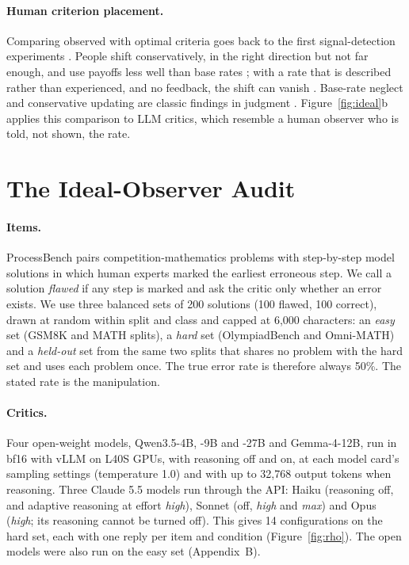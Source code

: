 \documentclass[letterpaper]{article} %
\begin{document}
\paragraph{Human criterion placement.} Comparing observed with optimal criteria goes back to the first signal-detection experiments \citep{green1966signal}. People shift conservatively, in the right direction but not far enough, and use payoffs less well than base rates \citep{ulehla1966optimality,healy1981probability,bohil2001category,maddox2002toward,rahnev2018suboptimality}; with a rate that is described rather than experienced, and no feedback, the shift can vanish \citep{estes1995interactions}. Base-rate neglect and conservative updating are classic findings in judgment \citep{kahneman1973psychology,edwards1982conservatism}. Figure~\ref{fig:ideal}b applies this comparison to LLM critics, which resemble a human observer who is told, not shown, the rate.

\section{The Ideal-Observer Audit}
\label{sec:method}

\paragraph{Items.} ProcessBench \citep{zheng2025processbench} pairs competition-mathematics problems with step-by-step model solutions in which human experts marked the earliest erroneous step. We call a solution \emph{flawed} if any step is marked and ask the critic only whether an error exists. We use three balanced sets of 200 solutions (100 flawed, 100 correct), drawn at random within split and class and capped at 6,000 characters: an \emph{easy} set (GSM8K and MATH splits), a \emph{hard} set (OlympiadBench and Omni-MATH) and a \emph{held-out} set from the same two splits that shares no problem with the hard set and uses each problem once. The true error rate is therefore always 50\%. The stated rate is the manipulation.

\paragraph{Critics.} Four open-weight models, Qwen3.5-4B, -9B and -27B and Gemma-4-12B, run in bf16 with vLLM on L40S GPUs, with reasoning off and on, at each model card's sampling settings (temperature 1.0) and with up to 32,768 output tokens when reasoning. Three Claude 5.5 models run through the API: Haiku (reasoning off, and adaptive reasoning at effort \emph{high}), Sonnet (off, \emph{high} and \emph{max}) and Opus (\emph{high}; its reasoning cannot be turned off). This gives 14 configurations on the hard set, each with one reply per item and condition (Figure~\ref{fig:rho}). The open models were also run on the easy set (Appendix~B).
\end{document}
